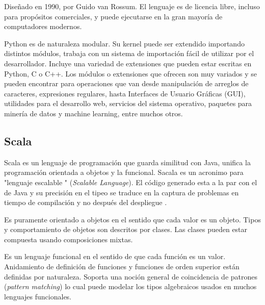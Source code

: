 Diseñado en 1990, por Guido van Rossum. El lenguaje es de licencia libre, incluso para propósitos comerciales, y puede ejecutarse en la gran mayoría de computadores modernos. \cite{26-josemy}

Python es de naturaleza modular. Su kernel puede ser extendido importando distintos módulos, trabaja con un sistema de importación fácil de utilizar por el desarrollador. Incluye una variedad de extensiones que pueden estar escritas en Python, C o C++. Los módulos o extensiones que ofrecen son muy variados y se pueden encontrar para operaciones que van desde manipulación de arreglos de caracteres, expresiones regulares, hasta Interfaces de Usuario Gráficas (GUI), utilidades para el desarrollo web, servicios del sistema operativo, paquetes para minería de datos y machine learning, entre muchos otros. \cite{26-josemy}

\subsection{Scala}

Scala es un lenguaje de programación  que guarda similitud con Java, unifica la programación orientada a objetos y la funcional\cite{scala}. Sacala es un acronimo para "lenguaje escalable " (\emph{Scalable Language}). El código generado esta a la par con el de Java y su precisión en el tipeo se traduce en la captura de problemas en tiempo de compilación y no después del despliegue \cite{scala2}.

Es puramente orientado a objetos en el sentido que cada valor es un objeto. Tipos y comportamiento de objetos son descritos por clases. Las clases pueden estar compuesta usando composiciones mixtas.\cite{scala}

Es un lenguaje funcional en el sentido de que cada función es un valor.  Anidamiento de definición de funciones y funciones de orden superior están definidas por naturaleza. Soporta una noción general de coincidencia de patrones (\emph{pattern matching}) lo cual puede modelar los tipos algebraicos usados en muchos lenguajes funcionales.\cite{scala} 







